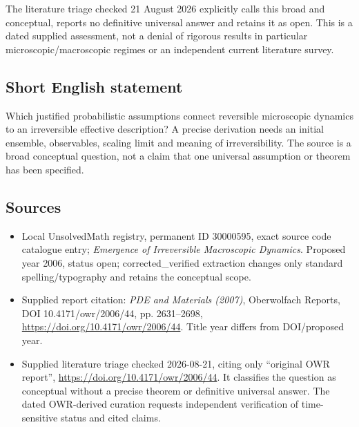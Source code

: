 \documentclass[11pt]{article}
\begin{document}
The literature triage checked 21 August 2026 explicitly calls this broad and conceptual, reports no definitive universal answer and retains it as open. This is a dated supplied assessment, not a denial of rigorous results in particular microscopic/macroscopic regimes or an independent current literature survey.
\subsection{Short English statement}
Which justified probabilistic assumptions connect reversible microscopic dynamics to an irreversible effective description? A precise derivation needs an initial ensemble, observables, scaling limit and meaning of irreversibility. The source is a broad conceptual question, not a claim that one universal assumption or theorem has been specified.
\subsection{Sources}
\begin{itemize}
\item Local UnsolvedMath registry, permanent ID 30000595, exact source code catalogue entry; \emph{Emergence of Irreversible Macroscopic Dynamics}. Proposed year 2006, status open; corrected\_verified extraction changes only standard spelling/typography and retains the conceptual scope.
\item Supplied report citation: \emph{PDE and Materials (2007)}, Oberwolfach Reports, DOI 10.4171/owr/2006/44, pp. 2631--2698, \url{https://doi.org/10.4171/owr/2006/44}. Title year differs from DOI/proposed year.
\item Supplied literature triage checked 2026-08-21, citing only ``original OWR report'', \url{https://doi.org/10.4171/owr/2006/44}. It classifies the question as conceptual without a precise theorem or definitive universal answer. The dated OWR-derived curation requests independent verification of time-sensitive status and cited claims.
\end{itemize}
\end{document}
